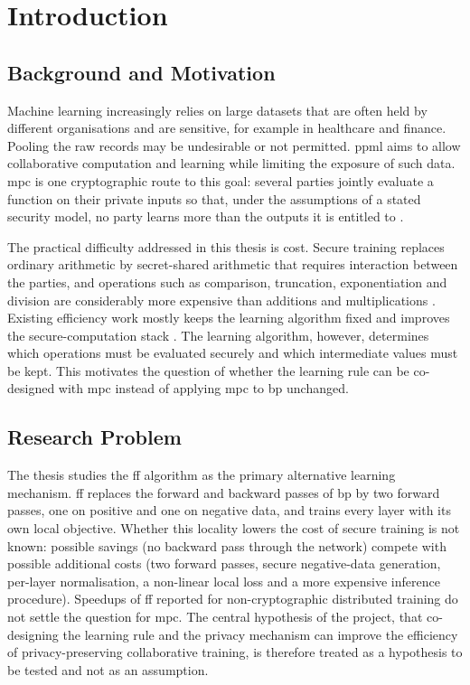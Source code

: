 \chapter{Introduction}
\label{chap:intro}

\section{Background and Motivation}\label{sec:intro-motivation}
Machine learning increasingly relies on large datasets that are often held by different organisations and are sensitive, for example in healthcare and finance. Pooling the raw records may be undesirable or not permitted. \ac{ppml} aims to allow collaborative computation and learning while limiting the exposure of such data. \ac{mpc} is one cryptographic route to this goal: several parties jointly evaluate a function on their private inputs so that, under the assumptions of a stated security model, no party learns more than the outputs it is entitled to \cite{zhou2024smpc,keller2020mpspdz}.

The practical difficulty addressed in this thesis is cost. Secure training replaces ordinary arithmetic by secret-shared arithmetic that requires interaction between the parties, and operations such as comparison, truncation, exponentiation and division are considerably more expensive than additions and multiplications \cite{keller2022sqt,zhang2025efficient}. Existing efficiency work mostly keeps the learning algorithm fixed and improves the secure-computation stack \cite{yang2025esmpc,wagh2021falcon,keller2022sqt,tan2021cryptgpu,lu2024clover}. The learning algorithm, however, determines which operations must be evaluated securely and which intermediate values must be kept. This motivates the question of whether the learning rule can be co-designed with \ac{mpc} instead of applying \ac{mpc} to \ac{bp} unchanged.

\section{Research Problem}\label{sec:intro-problem}
The thesis studies the \ac{ff} algorithm \cite{hinton2022ff} as the primary alternative learning mechanism. \ac{ff} replaces the forward and backward passes of \ac{bp} by two forward passes, one on positive and one on negative data, and trains every layer with its own local objective. Whether this locality lowers the cost of secure training is not known: possible savings (no backward pass through the network) compete with possible additional costs (two forward passes, secure negative-data generation, per-layer normalisation, a non-linear local loss and a more expensive inference procedure). Speedups of \ac{ff} reported for non-cryptographic distributed training \cite{aktemur2025pff} do not settle the question for \ac{mpc}. The central hypothesis of the project, that co-designing the learning rule and the privacy mechanism can improve the efficiency of privacy-preserving collaborative training, is therefore treated as a hypothesis to be tested and not as an assumption.

